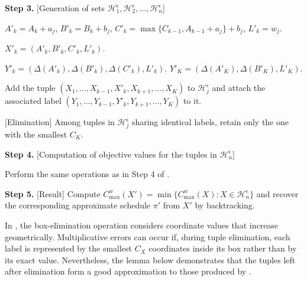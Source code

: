 ﻿\documentclass[12pt]{article} \textheight=24.5cm \textwidth=16.5cm \parskip = 0.165cm
\begin{document}
\begin{sloppypar}
\begin{algorithm}[H]
            \textbf{Step 3.} [Generation of sets $\mathcal{H}_1^{\epsilon}, \mathcal{H}_2^{\epsilon}, \ldots, \mathcal{H}_n^{\epsilon}$]

            {
                {
                    {
                        $A'_k = A_k+a_j$, $B'_k = B_k+b_j$, $C'_k = \max\{C_{k-1}, A_{k-1}+a_j\}+b_j$, $L'_k= w_j$. \;

                        $X'_k=(A'_k, B'_k, C'_k, L'_k)$. \;

                        {
                            $Y'_k=(\Delta(A'_k), \Delta(B'_k), \Delta(C'_k), L'_k)$. \;
                        }
                        {
                            $Y'_K=(\Delta(A'_K), \Delta(B'_K), L'_K)$. \;
                        }

                        Add the tuple $(X_1, \ldots, X_{k-1}, X'_k, X_{k+1}, \ldots, X_K)$ to $\mathcal{H}_j^{\epsilon}$ and attach the associated label $(Y_1, \ldots, Y_{k-1}, Y'_k, Y_{k+1}, \ldots, Y_K)$ to it. \;
                    }
                }
                [Elimination] Among tuples in $\mathcal{H}_j^{\epsilon}$ sharing identical labels, retain only the one with the smallest $C_K$. \;
            }

            \textbf{Step 4.} [Computation of objective values for the tuples in $\mathcal{H}_n^{\epsilon}$]

            {
                Perform the same operations as in Step 4 of .
            }

            \textbf{Step 5.} [Result] Compute $C_{\max}^w(X')=\min \{C_{\max}^w(X): X \in \mathcal{H}_n^{\epsilon}\}$ and recover the corresponding approximate schedule $\pi'$ from $X'$ by backtracking. \;

        \end{algorithm}

        In , the box-elimination operation considers coordinate values that increase geometrically.
        Multiplicative errors can occur if, during tuple elimination, each label is represented by the smallest $C_X$ coordinates inside its box rather than by its exact value.
        Nevertheless, the lemma below demonstrates that the tuples left after elimination form a good approximation to those produced by .


\end{sloppypar}
\end{document}
